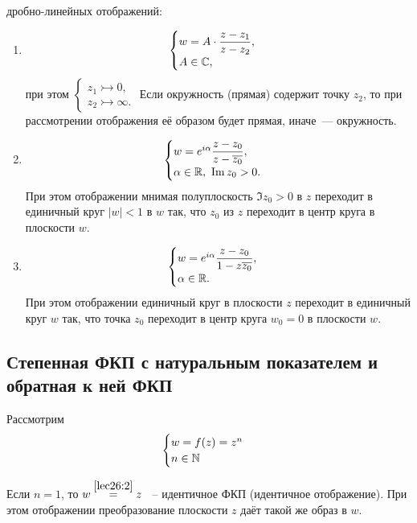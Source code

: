 \documentclass[../../main.tex]{subfiles}
\begin{document}
\begin{examples}
\begin{enumerate}
дробно-линейных отображений:
\begin{enumerate}
 \item 
 \[
  \begin{cases}
   w = A\cdot \dfrac{z - z_1}{z - z_2},\\
   A \in \mathbb{C},
  \end{cases}\]
при этом
$\begin{cases}
  z_1 \rightarrowtail 0,\\
  z_2 \rightarrowtail \infty.  
 \end{cases}
 $
Если окружность (прямая) содержит точку $z_2$, то при рассмотрении отображения
её образом будет прямая, иначе~--- окружность.
 \item
\[
\begin{cases}
 w = e^{i\alpha} \dfrac{z - z_0}{z- \overline{z_0}}, \\
 \alpha \in \mathbb{R},\  \operatorname{Im} z_0 > 0.
\end{cases}     
\]
При этом отображении мнимая полуплоскость $\Im z_0 > 0$ в \textcircled{$z$} 
переходит в единичный круг $|w| < 1$ в \textcircled{$w$} так,
что $z_0$ из \textcircled{$z$} переходит в центр круга в плоскости
\textcircled{$w$}.

 \item
\[
 \begin{cases}
  w = e^{i\alpha} \dfrac{z - z_0}{1 - z \overline{z_0}}, \\
  \alpha \in \mathbb{R}.
 \end{cases}
\]
При этом отображении единичный круг в плоскости \textcircled{$z$}
переходит в единичный круг \textcircled{$w$} так, что точка $z_0$ переходит
в центр круга  $w_0 = 0$ в плоскости \textcircled{$w$}.
\end{enumerate}

\end{enumerate}
\end{examples}

\subsection{Степенная ФКП с натуральным показателем и обратная к ней ФКП}
Рассмотрим
\begin{equation}
\label{lec26:2}
\begin{cases}
 w = f(z) = z^n \\
 n \in \mathbb{N}
\end{cases}
\end{equation}

Если $n = 1$, то $w \stackrel{\eqref{lec26:2}}{=} z$ ~-- 
идентичное ФКП (идентичное отображение).
При этом отображении преобразование плоскости \textcircled{$z$} 
даёт такой же образ в \textcircled{$w$}.
\end{document}

